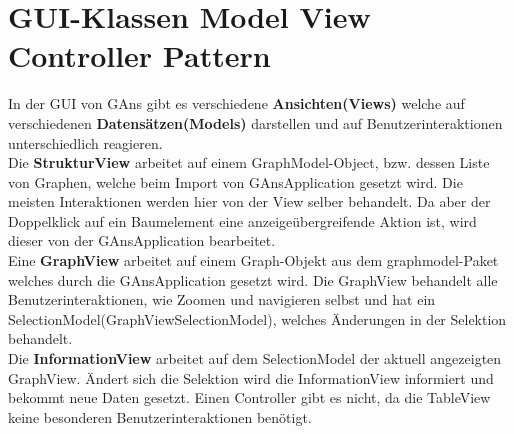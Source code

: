 \section{GUI-Klassen Model View Controller Pattern}
In der GUI von GAns gibt es verschiedene \textbf{Ansichten(Views)} welche auf verschiedenen \textbf{Datensätzen(Models)} darstellen und auf Benutzerinteraktionen unterschiedlich reagieren. \\
Die \textbf{StrukturView} arbeitet auf einem GraphModel-Object, bzw. dessen Liste von Graphen, welche beim Import von GAnsApplication gesetzt wird. Die meisten Interaktionen werden hier von der View selber behandelt. Da aber der Doppelklick auf ein Baumelement eine anzeigeübergreifende Aktion ist, wird dieser von der GAnsApplication bearbeitet. \\
Eine \textbf{GraphView} arbeitet auf einem Graph-Objekt aus dem graphmodel-Paket welches durch die GAnsApplication gesetzt wird. Die GraphView behandelt alle Benutzerinteraktionen, wie Zoomen und navigieren selbst und hat ein SelectionModel(GraphViewSelectionModel), welches Änderungen in der Selektion behandelt. \\
Die \textbf{InformationView} arbeitet auf dem SelectionModel der aktuell angezeigten GraphView. Ändert sich die Selektion wird die InformationView informiert und bekommt neue Daten gesetzt. Einen Controller gibt es nicht, da die TableView keine besonderen Benutzerinteraktionen benötigt.